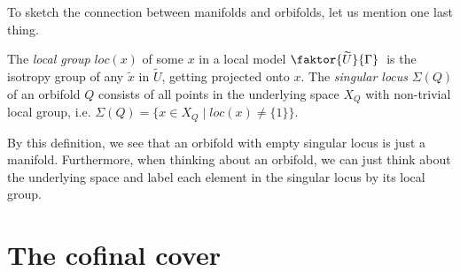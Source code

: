 To sketch the connection between manifolds and orbifolds, let us mention one last thing.

\begin{definition}
    The \emph{local group} \(loc(x)\) of some \(x\) in a local model \(\faktor{\widetilde{U}}{\Gamma}\;\) is the isotropy group of any \(\widetilde{x}\) in \(\widetilde{U}\), getting projected onto \(x\).
    The \emph{singular locus} \(\Sigma (Q)\) of an orbifold \(Q\) consists of all points in the underlying space \(X_Q\) with non-trivial local group, i.e. \(\Sigma(Q) = \{x \in X_Q \;\vert\; loc(x) \neq \{1\}\}\).
\end{definition}

By this definition, we see that an orbifold with empty singular locus is just a manifold.
Furthermore, when thinking about an orbifold, we can just think about the underlying space and label each element in the singular locus by its local group.


\section{The cofinal cover}